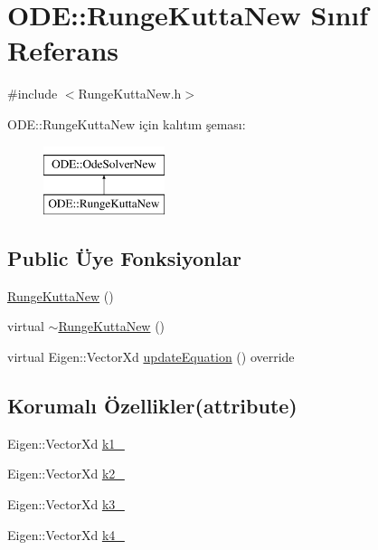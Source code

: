 \hypertarget{classODE_1_1RungeKuttaNew}{}\section{O\+DE\+::Runge\+Kutta\+New Sınıf Referans}
\label{classODE_1_1RungeKuttaNew}


{\ttfamily \#include $<$Runge\+Kutta\+New.\+h$>$}

O\+DE\+::Runge\+Kutta\+New için kalıtım şeması\+:\begin{figure}[H]
\begin{center}
\leavevmode
\includegraphics[height=2.000000cm]{classODE_1_1RungeKuttaNew}
\end{center}
\end{figure}
\subsection*{Public Üye Fonksiyonlar}
\begin{DoxyCompactItemize}
\item 
\mbox{\hyperlink{classODE_1_1RungeKuttaNew_acd6ace7f77c731e8fb88ca4b44ce0c28}{Runge\+Kutta\+New}} ()
\item 
virtual \mbox{\hyperlink{classODE_1_1RungeKuttaNew_adb0b5fee6006a36f363da4adb008f546}{$\sim$\+Runge\+Kutta\+New}} ()
\item 
virtual Eigen\+::\+Vector\+Xd \mbox{\hyperlink{classODE_1_1RungeKuttaNew_a9a6722699baa4adc50d10fa5ccc156ed}{update\+Equation}} () override
\end{DoxyCompactItemize}
\subsection*{Korumalı Özellikler(attribute)}
\begin{DoxyCompactItemize}
\item 
Eigen\+::\+Vector\+Xd \mbox{\hyperlink{classODE_1_1RungeKuttaNew_a7a7416d2d91440f6f853ca90de8d15de}{k1\+\_\+}}
\item 
Eigen\+::\+Vector\+Xd \mbox{\hyperlink{classODE_1_1RungeKuttaNew_a3cd4dea31cce03d9e5c8fa1009f3b541}{k2\+\_\+}}
\item 
Eigen\+::\+Vector\+Xd \mbox{\hyperlink{classODE_1_1RungeKuttaNew_a0ed6b19563e937aeba0c05b5ba80cc5e}{k3\+\_\+}}
\item 
Eigen\+::\+Vector\+Xd \mbox{\hyperlink{classODE_1_1RungeKuttaNew_aebffa1932807f11ca1357968117fff47}{k4\+\_\+}}
\end{DoxyCompactItemize}


